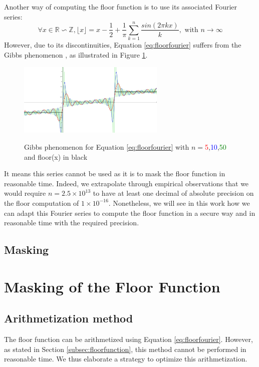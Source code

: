 \documentclass[runningheads]{llncs}
\begin{document}
\noindent Another way of computing the floor function is to use its associated Fourier series:\begin{equation}\label{eq:floorfourier}
  \forall x \in \mathbb{R}\backsim \mathbb{Z}, \lfloor x\rfloor = x - \frac{1}{2} + \frac{1}{\pi}\sum_{k=1}^n \frac{sin(2\pi kx)}{k},\text{ with }n\rightarrow \infty
\end{equation}
However, due to its discontinuities, Equation \ref{eq:floorfourier} suffers from the Gibbs phenomenon \cite{8e44e918-40ae-3857-bb25-dc12ccf9e7c3}, as illustrated in Figure \ref{fig:gibbs}. 
\begin{figure}[!ht]
  \centering
  \includegraphics[width=7cm]{figure/gibbsphenomenonsmall.png}
  \label{fig:gibbs}
  \caption{Gibbs phenomenon for Equation \ref{eq:floorfourier} with $n=$\textcolor{red}{5},\textcolor{blue}{10},\textcolor{green}{50} and floor(x) in black}
\end{figure}
It means this series cannot be used as it is to mask the floor function in reasonable time. Indeed, we extrapolate through empirical observations that we would require $n=\num{2.5}\times 10^{13}$ to have at least one decimal of absolute precision on the floor computation of $1\times 10^{-16}$. Nonetheless, we will see in this work how we can adapt this Fourier series to compute the floor function in a secure way and in reasonable time with the required precision.
\subsection{Masking}

\section{Masking of the Floor Function}\label{sec:maskfloor}
\subsection{Arithmetization method}
The floor function can be arithmetized using Equation \ref{eq:floorfourier}. However, as stated in Section \ref{subsec:floorfunction}, this method cannot be performed in reasonable time. We thus elaborate a strategy to optimize this arithmetization.
\end{document}
